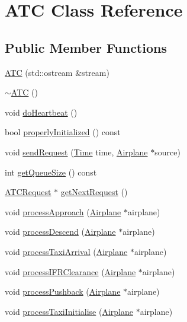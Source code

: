 \hypertarget{classATC}{}\section{A\+TC Class Reference}
\label{classATC}
\subsection*{Public Member Functions}
\begin{DoxyCompactItemize}
\item 
\hyperlink{classATC_a8f6706de026923bedcd23f8784213642}{A\+TC} (std\+::ostream \&stream)
\item 
\hyperlink{classATC_a38f7e89c6714ec322ab0796020047f7e}{$\sim$\+A\+TC} ()
\item 
void \hyperlink{classATC_a731ad9baa5234612a9c1826d67d9edd8}{do\+Heartbeat} ()
\item 
bool \hyperlink{classATC_a6b6a10a87c06028bd96d6e5efff170b7}{properly\+Initialized} () const 
\item 
void \hyperlink{classATC_aaabbddfb988289b786b18ba8f50510f2}{send\+Request} (\hyperlink{classTime}{Time} time, \hyperlink{classAirplane}{Airplane} $\ast$source)
\item 
int \hyperlink{classATC_a5ed72477deceb2ae06dbfc01fe308b9b}{get\+Queue\+Size} () const 
\item 
\hyperlink{structATCRequest}{A\+T\+C\+Request} $\ast$ \hyperlink{classATC_a2882681c8a007c3acb80d027807d8f50}{get\+Next\+Request} ()
\item 
void \hyperlink{classATC_a755a93205ae226d1c621c3532966f731}{process\+Approach} (\hyperlink{classAirplane}{Airplane} $\ast$airplane)
\item 
void \hyperlink{classATC_af11ccc6c53b83153011d283fbc23ceb2}{process\+Descend} (\hyperlink{classAirplane}{Airplane} $\ast$airplane)
\item 
void \hyperlink{classATC_a2d6658150b7c23c346384c92f93edf76}{process\+Taxi\+Arrival} (\hyperlink{classAirplane}{Airplane} $\ast$airplane)
\item 
void \hyperlink{classATC_ab30a3ed1d8d90babfeb65446594bfd6d}{process\+I\+F\+R\+Clearance} (\hyperlink{classAirplane}{Airplane} $\ast$airplane)
\item 
void \hyperlink{classATC_aed15f30015f564a4ff785a7e0c2fc07c}{process\+Pushback} (\hyperlink{classAirplane}{Airplane} $\ast$airplane)
\item 
void \hyperlink{classATC_abddb77d748013cb94261f5c84ea7882f}{process\+Taxi\+Initialise} (\hyperlink{classAirplane}{Airplane} $\ast$airplane)

\end{DoxyCompactItemize}
